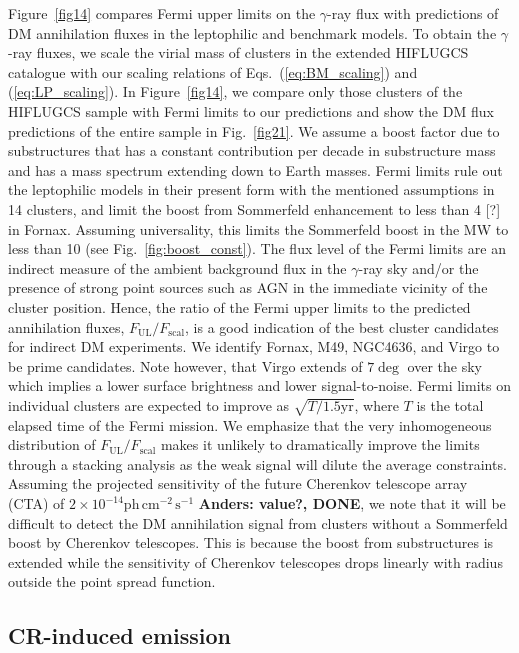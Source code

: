\documentclass[10pt,aps,pra,reprint,amsmath,amsfonts,amssymb,showpacs,nofootinbib,floatfix]{revtex4-1}
\newcommand{\rmn}{\mathrm}
\begin{document}
Figure~\ref{fig14} compares Fermi upper limits on the $\gamma$-ray
flux with predictions of DM annihilation fluxes in the leptophilic and
benchmark models.  To obtain the $\gamma$-ray fluxes, we scale the
virial mass of clusters in the extended HIFLUGCS catalogue
\cite{2002ApJ...567..716R} with our scaling relations of
Eqs.~(\ref{eq:BM_scaling}) and (\ref{eq:LP_scaling}). In
Figure~\ref{fig14}, we compare only those clusters of the HIFLUGCS
sample with Fermi limits to our predictions and show the DM flux
predictions of the entire sample in Fig.~\ref{fig21}.  We assume a
boost factor due to substructures that has a constant contribution per
decade in substructure mass and has a mass spectrum extending down to
Earth masses. Fermi limits rule out the leptophilic models in their
present form with the mentioned assumptions in 14 clusters, and limit
the boost from Sommerfeld enhancement to less than 4 [?] in
Fornax. Assuming universality, this limits the Sommerfeld boost in the
MW to less than 10 (see Fig.~\ref{fig:boost_const}).  The flux level
of the Fermi limits are an indirect measure of the ambient background
flux in the $\gamma$-ray sky and/or the presence of strong point
sources such as AGN in the immediate vicinity of the cluster
position. Hence, the ratio of the Fermi upper limits to the predicted
annihilation fluxes, $F_{\mathrm{UL}}/F_{\mathrm{scal}}$, is a good
indication of the best cluster candidates for indirect DM
experiments. We identify Fornax, M49, NGC4636, and Virgo to be prime
candidates. Note however, that Virgo extends of $7\deg$ over the sky
which implies a lower surface brightness and lower signal-to-noise.
Fermi limits on individual clusters are expected to improve as
$\sqrt{T/1.5 \mathrm{yr}}$, where $T$ is the total elapsed time of the
Fermi mission. We emphasize that the very inhomogeneous distribution
of $F_{\mathrm{UL}}/ F_{\mathrm{scal}}$ makes it unlikely to
dramatically improve the limits through a stacking analysis as the
weak signal will dilute the average constraints.  Assuming the
projected sensitivity of the future Cherenkov telescope array (CTA) of
$2\times10^{-14} \rmn{ph}\,\rmn{cm}^{-2}\,\rmn{s}^{-1}$
\cite{2009arXiv0908.1410D} {\bf Anders: value?, DONE}, we note that it
will be difficult to detect the DM annihilation signal from clusters
without a Sommerfeld boost by Cherenkov telescopes. This is because
the boost from substructures is extended while the sensitivity of
Cherenkov telescopes drops linearly with radius outside the point
spread function.

\subsection{CR-induced emission}
\end{document}
